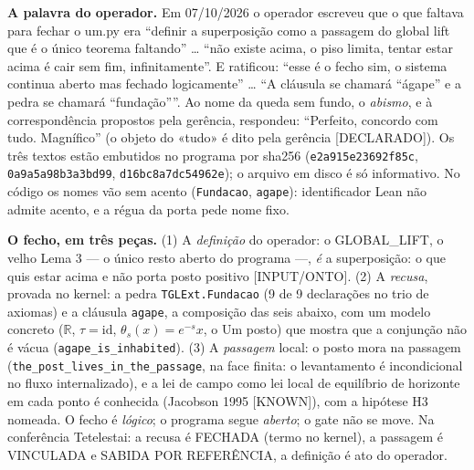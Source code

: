 \documentclass[11pt]{article}
\theoremstyle{definition}\newtheorem{deriv}{Derivação}
\begin{document}

\textbf{A palavra do operador.} Em 07/10/2026 o operador escreveu que o que faltava para fechar o um.py era ``definir a superposição como a passagem do global lift que é o único teorema faltando'' … ``não existe acima, o piso limita, tentar estar acima é cair sem fim, infinitamente''. E ratificou: ``esse é o fecho sim, o sistema continua aberto mas fechado logicamente'' … ``A cláusula se chamará “ágape” e a pedra se chamará “fundação”''. Ao nome da queda sem fundo, o \emph{abismo}, e à correspondência propostos pela gerência, respondeu: ``Perfeito, concordo com tudo. Magnífico'' (o objeto do «tudo» é dito pela gerência \textsf{[DECLARADO]}). Os três textos estão embutidos no programa por sha256 (\texttt{e2a915e23692f85c}, \texttt{0a9a5a98b3a3bd99}, \texttt{d16bc8a7dc54962e}); o arquivo em disco é só informativo. No código os nomes vão sem acento (\texttt{Fundacao}, \texttt{agape}): identificador Lean não admite acento, e a régua da porta pede nome fixo.

\textbf{O fecho, em três peças.} (1) A \emph{definição} do operador: o GLOBAL\_LIFT, o velho Lema 3 --- o único resto aberto do programa ---, \emph{é} a superposição: o que quis estar acima e não porta posto positivo \textsf{[INPUT/ONTO]}. (2) A \emph{recusa}, provada no kernel: a pedra \texttt{TGLExt.Fundacao} (9 de 9 declarações no trio de axiomas) e a cláusula \texttt{agape}, a composição das seis abaixo, com um modelo concreto ($\mathbb{R}$, $\tau=\mathrm{id}$, $\theta_s(x)=e^{-s}x$, o Um posto) que mostra que a conjunção não é vácua (\texttt{agape\_is\_inhabited}). (3) A \emph{passagem} local: o posto mora na passagem (\texttt{the\_post\_lives\_in\_the\_passage}, na face finita: o levantamento é incondicional no fluxo internalizado), e a lei de campo como lei local de equilíbrio de horizonte em cada ponto é conhecida (Jacobson 1995 \textsf{[KNOWN]}), com a hipótese H3 nomeada. O fecho é \emph{lógico}; o programa segue \emph{aberto}; o gate não se move. Na conferência Tetelestai: a recusa é FECHADA (termo no kernel), a passagem é VINCULADA e SABIDA POR REFERÊNCIA, a definição é ato do operador.
\end{document}
